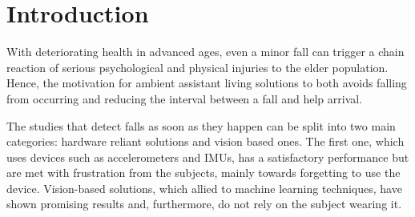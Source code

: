 \documentclass[conference]{IEEEtran}
\begin{document}
\section{Introduction}

With deteriorating health in advanced ages, even a minor fall can trigger a chain reaction of serious psychological and physical injuries to the elder population. Hence, the motivation for ambient assistant living solutions to both avoids falling from occurring and reducing the interval between a fall and help arrival.

The studies that detect falls as soon as they happen can be split into two main categories: hardware reliant solutions and vision based ones. The first one, which uses devices such as accelerometers and IMUs, has a satisfactory performance but are met with frustration from the subjects, mainly towards forgetting to use the device. Vision-based solutions, which allied to machine learning techniques, have shown promising results and, furthermore, do not rely on the subject wearing it.
\end{document}
